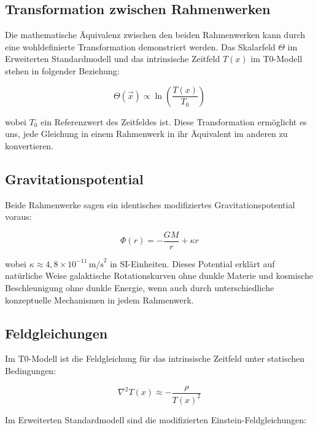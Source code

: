 \documentclass[12pt,a4paper]{article}
\newcommand{\Tfield}{T(x)}
\newcommand{\Tzero}{T_0}
\newcommand{\vecx}{\vec{x}}
\begin{document}
	\subsection{Transformation zwischen Rahmenwerken}
	\label{subsec:transformation}
	
	Die mathematische Äquivalenz zwischen den beiden Rahmenwerken kann durch eine wohldefinierte Transformation demonstriert werden. Das Skalarfeld \(\Theta\) im Erweiterten Standardmodell und das intrinsische Zeitfeld \(\Tfield\) im T0-Modell stehen in folgender Beziehung:
	
	\begin{equation}
		\Theta(\vecx) \propto \ln\left(\frac{\Tfield}{\Tzero}\right)
	\end{equation}
	
	wobei \(\Tzero\) ein Referenzwert des Zeitfeldes ist. Diese Transformation ermöglicht es uns, jede Gleichung in einem Rahmenwerk in ihr Äquivalent im anderen zu konvertieren.
	
	\subsection{Gravitationspotential}
	\label{subsec:gravitational_potential}
	
	Beide Rahmenwerke sagen ein identisches modifiziertes Gravitationspotential voraus:
	
	\begin{equation}
		\Phi(r) = -\frac{GM}{r} + \kappa r
	\end{equation}
	
	wobei \(\kappa \approx 4,8 \times 10^{-11} \, \text{m/s}^2\) in SI-Einheiten. Dieses Potential erklärt auf natürliche Weise galaktische Rotationskurven ohne dunkle Materie und kosmische Beschleunigung ohne dunkle Energie, wenn auch durch unterschiedliche konzeptuelle Mechanismen in jedem Rahmenwerk.
	
	\subsection{Feldgleichungen}
	\label{subsec:field_equations}
	
	Im T0-Modell ist die Feldgleichung für das intrinsische Zeitfeld unter statischen Bedingungen:
	
	\begin{equation}
		\nabla^2\Tfield \approx -\frac{\rho}{\Tfield^2}
	\end{equation}
	
	Im Erweiterten Standardmodell sind die modifizierten Einstein-Feldgleichungen:
	
\end{document}
